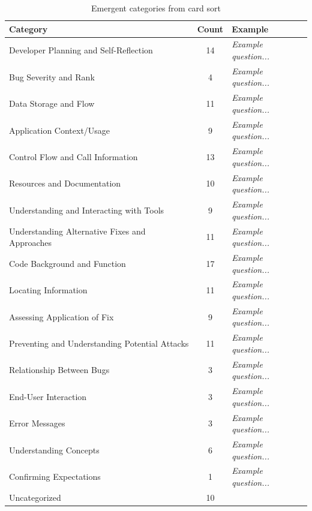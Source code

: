 \documentclass[conference]{IEEEtran}
\begin{document}
\begin{table} 
\centering
\caption{Emergent categories from card sort}
\begin{tabular}{|l|c|l|}
\rowcolor{gray!50}
\hline
    Category											& Count			& Example 	\\
    \hline		
    Developer Planning and Self-Reflection				& 14    		& \emph{Example question...}			\\
    \hline
    Bug Severity and Rank								& 4     		& \emph{Example question...}			\\
    \hline
    Data Storage and Flow								& 11     		& \emph{Example question...}		\\
    \hline
    Application Context/Usage							& 9     		& \emph{Example question...}			\\
    \hline
    Control Flow and Call Information					& 13     		& \emph{Example question...}		\\
    \hline
    Resources and Documentation							& 10     		& \emph{Example question...}			\\
    \hline
    Understanding and Interacting with Tools			& 9     		& \emph{Example question...}			\\
    \hline
    Understanding Alternative Fixes and Approaches		& 11     		& \emph{Example question...}			\\
    \hline
    Code Background and Function 	 					& 17     		& \emph{Example question...}			\\
    \hline
    Locating Information 								& 11      		& \emph{Example question...}			\\
    \hline
    Assessing Application of Fix						& 9     		& \emph{Example question...}			\\
    \hline
    Preventing and Understanding Potential Attacks		& 11     		& \emph{Example question...}			\\
    \hline
    Relationship Between Bugs							& 3     		& \emph{Example question...}			\\
    \hline
    End-User Interaction								& 3     		& \emph{Example question...}		\\
    \hline
    Error Messages										& 3     		& \emph{Example question...}			\\
    \hline
    Understanding Concepts								& 6 			& \emph{Example question...}				\\
    \hline
    Confirming Expectations					 			& 1				& \emph{Example question...}   \\
    \hline
    Uncategorized										& 10    		& \emph{} \\
    \hline
\end{tabular}
\label{table:categories}
\end{table}
\end{document}
